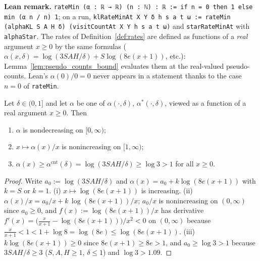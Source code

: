\textbf{Lean remark.} \texttt{rateMin (α : ℝ → ℝ) (n : ℕ) : ℝ := if n = 0 then 1 else min (α n / n) 1};
on a run, \texttt{klRateMinAt X Y δ h s a t ω := rateMin (alphaKL S A H δ) (visitCountAt X Y h s a t ω)}
and \texttt{starRateMinAt} with \texttt{alphaStar}. The rates of Definition~\ref{def:rates} are
defined as functions of a \emph{real} argument $x \ge 0$ by the same formulas
($\alpha(x,\delta) = \log(3SAH/\delta) + S\log(8e(x+1))$, etc.): Lemma~\ref{lem:pseudo_counts_bound}
evaluates them at the real-valued pseudo-counts. Lean's $\alpha(0)/0 = 0$ never appears in a
statement thanks to the case $n = 0$ of \texttt{rateMin}.

\begin{lemma}\label{lem:sc_rates_real}
\leanok
Let $\delta \in (0, 1]$ and let $\alpha$ be one of $\alpha(\cdot,\delta)$, $\alpha^*(\cdot,\delta)$,
viewed as a function of a real argument $x \ge 0$. Then
\begin{enumerate}
  \item[(i)] $\alpha$ is nondecreasing on $[0,\infty)$;
  \item[(ii)] $x \mapsto \alpha(x)/x$ is nonincreasing on $[1, \infty)$;
  \item[(iii)] $\alpha(x) \ge \alpha^{\mathrm{cnt}}(\delta) = \log(3SAH/\delta) \ge \log 3 > 1$ for all $x \ge 0$.
\end{enumerate}
\end{lemma}

\begin{proof}
\leanok
{}
Write $a_0 := \log(3SAH/\delta)$ and $\alpha(x) = a_0 + k\log(8e(x+1))$ with $k = S$ or $k = 1$.
(i) $x \mapsto \log(8e(x+1))$ is increasing. (ii) $\alpha(x)/x = a_0/x + k\,\log(8e(x+1))/x$;
$a_0/x$ is nonincreasing on $(0,\infty)$ since $a_0 \ge 0$, and $f(x) := \log(8e(x+1))/x$ has
derivative $f'(x) = \big(\tfrac{x}{x+1} - \log(8e(x+1))\big)/x^2 < 0$ on $(0,\infty)$ because
$\tfrac{x}{x+1} < 1 < 1 + \log 8 = \log(8e) \le \log(8e(x+1))$. (iii) $k\log(8e(x+1)) \ge 0$ since
$8e(x+1) \ge 8e > 1$, and $a_0 \ge \log 3 > 1$ because $3SAH/\delta \ge 3$ ($S, A, H \ge 1$,
$\delta \le 1$) and $\log 3 > 1.09$.
\end{proof}


